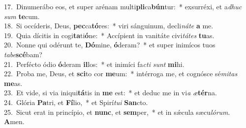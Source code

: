 {17.~}Dinumerábo eos, et super arénam multi\textbf{pli}ca\textbf{bún}tur:~* exsurréxi, et a\textit{dhuc} \textit{sum} \textbf{te}cum.\\
{18.~}Si occíderis, Deus, \textbf{pec}ca\textbf{tó}res:~* viri sánguinum, decli\textit{ná}\textit{te} \textbf{a} me.\\
{19.~}Quia dícitis in cogi\textbf{ta}ti\textbf{ó}ne:~* Accípient in vanitáte civi\textit{tá}\textit{tes} \textbf{tu}as.\\
{20.~}Nonne qui odérunt te, \textbf{Dó}mine, \textbf{ó}deram?~* et super inimícos tuos \textit{ta}\textit{be}\textbf{scé}bam?\\
{21.~}Perfécto ódio \textbf{ó}deram \textbf{il}los:~* et inimíci fa\textit{cti} \textit{sunt} \textbf{mi}hi.\\
{22.~}Proba me, Deus, et \textbf{sci}to cor \textbf{me}um:~* intérroga me, et cognósce sé\textit{mi}\textit{tas} \textbf{me}as.\\
{23.~}Et vide, si via iniqui\textbf{tá}tis in \textbf{me} est:~* et deduc me in vi\textit{a} \textit{æ}\textbf{tér}na.\\
{24.~}Glória \textbf{Pa}tri, et \textbf{Fí}lio,~* et Spirí\textit{tu}\textit{i} \textbf{San}cto.\\
{25.~}Sicut erat in princípio, et \textbf{nunc}, et \textbf{sem}per,~* et in sǽcula sæcu\textit{ló}\textit{rum}. \textbf{A}men.\\
